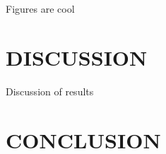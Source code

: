 \documentclass[conference]{ieeeconf}
\begin{document}
Figures are cool

\section{DISCUSSION}

Discussion of results 

\section{CONCLUSION}

\addtolength{\textheight}{-12cm}   %












\end{document}
